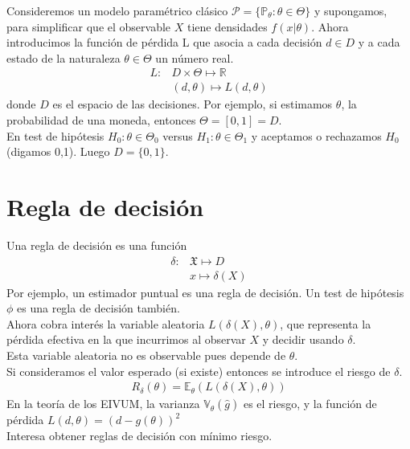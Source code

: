 \documentclass[10pt]{article}
\theoremstyle{plain}
\theoremstyle{definition}
\begin{document}
Consideremos un modelo paramétrico clásico $\mathcal{P}= \{\mathbb{P}_{\theta}\colon \theta \in \Theta\}$ y supongamos, para simplificar que el observable $X$ tiene densidades $f(x|\theta)$. Ahora introducimos la función de pérdida L que asocia a cada decisión $d\in D$ y a cada estado de la naturaleza $\theta \in \Theta$ un número real.
\begin{align*}
L:& D\times \Theta\mapsto \mathbb{R}\\
&(d,\theta) \mapsto L(d,\theta)
\end{align*}
donde $D$ es el espacio de las decisiones. Por ejemplo, si estimamos $\theta$, la probabilidad de una moneda, entonces $\Theta = [0,1] = D$.\\

En test de hipótesis $H_{0}: \theta \in \Theta_{0}$ versus $H_{1}: \theta \in \Theta_{1}$ y aceptamos o rechazamos $H_{0}$ (digamos 0,1). Luego $D=\{0,1\}$.\\

\section{Regla de decisión}
Una regla de decisión es una función
\begin{align*}
\delta \colon &\mathfrak{X} \mapsto D\\
& x \mapsto \delta(X)
\end{align*}
Por ejemplo, un estimador puntual es una regla de decisión. Un test de hipótesis $\phi$ es una regla de decisión también.\\

Ahora cobra interés la variable aleatoria $L(\delta(X),\theta)$, que representa la pérdida efectiva en la que incurrimos al observar $X$ y decidir usando $\delta$.\\

Esta variable aleatoria no es observable pues depende de $\theta$.\\

Si consideramos el valor esperado (si existe) entonces se introduce el riesgo de $\delta$.
\begin{align*}
R_{\delta}(\theta) = \mathbb{E}_{\theta}(L(\delta(X),\theta))
\end{align*}
En la teoría de los EIVUM, la varianza $\mathbb{V}_{\theta}(\hat{g})$ es el riesgo, y la función de pérdida $L(d,\theta) = (d-g(\theta))^2$\\

Interesa obtener reglas de decisión con mínimo riesgo.\\
\end{document}
